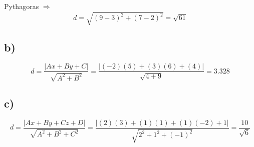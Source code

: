 Pythagoras $\Rightarrow$ $$d = \sqrt{(9-3)^2+(7-2)^2} = \sqrt{61}$$

\subsection*{b)}
$$d = \frac{|Ax+By+C|}{\sqrt{A^2+B^2}} = 
      \frac{|(-2)(5)+(3)(6)+(4)|}{\sqrt{4+9}} = 
      3.328$$

\subsection*{c)}
$$d = \frac{|Ax+By+Cz+D|}{\sqrt{A^2+B^2+C^2}} = 
      \frac{|(2)(3)+(1)(1)+(1)(-2)+1|}{\sqrt{2^2+1^2+(-1)^2}} = 
      \frac{10}{\sqrt{6}}$$
